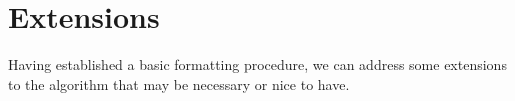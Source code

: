 \section{Extensions}

Having established a basic formatting procedure,
we can address some extensions to the algorithm that may be necessary or nice to have.




